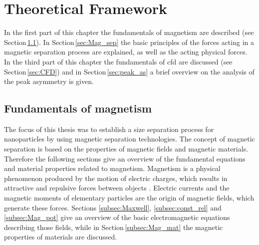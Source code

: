 

\chapter{Theoretical Framework}
\label{chap:chap_theo}


In the first part of this chapter the fundamentals of magnetism are described (see Section\,\ref{sec:Fund_mag}). In Section\,\ref{sec:Mag_sep} the basic principles of the forces acting in a magnetic separation process are explained, as well as the acting physical forces. In the third part of this chapter the fundamentals of \gls{cfd} are discussed (see Section\,\ref{sec:CFD}) and in Section\,\ref{sec:peak_as} a brief overview on the analysis of the peak asymmetry is given.  

\section{Fundamentals of magnetism}
\label{sec:Fund_mag}
The focus of this thesis was to establish a size separation process for nanoparticles by using magnetic separation technologies. The concept of magnetic separation is based on the properties of magnetic fields and magnetic materials. Therefore the following sections give an overview of the fundamental equations and material properties related to magnetism. Magnetism is a physical phenomenon produced by the motion of electric charges, which results in attractive and repulsive forces between objects \cite{stevenson2010oxford}. Electric currents and the magnetic moments of elementary particles are the origin of magnetic fields, which generate these forces. Sections \ref{subsec:Maxwell}, \ref{subsec:const_rel} and \ref{subsec:Mag_pot} give an overview of the basic electromagnetic equations describing those fields, while in Section\,\ref{subsec:Mag_mat} the magnetic properties of materials are discussed.

